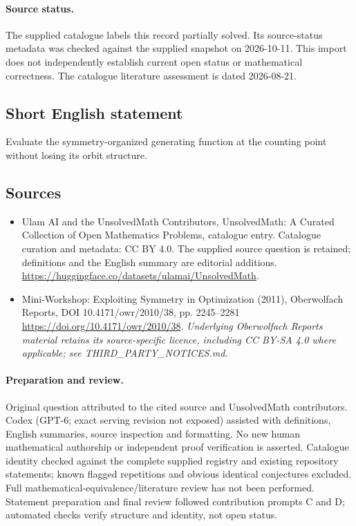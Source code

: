 \documentclass[11pt]{article}
\begin{document}
\paragraph{Source status.}
The supplied catalogue labels this record partially solved. Its source-status metadata was checked against the supplied snapshot on 2026-10-11. This import does not independently establish current open status or mathematical correctness. The catalogue literature assessment is dated 2026-08-21.
\subsection{Short English statement}
Evaluate the symmetry-organized generating function at the counting point without losing its orbit structure.
\subsection{Sources}
\begin{itemize}
\item[S1] Ulam AI and the UnsolvedMath Contributors, UnsolvedMath: A Curated Collection of Open Mathematics Problems, catalogue entry. Catalogue curation and metadata: CC BY 4.0. The supplied source question is retained; definitions and the English summary are editorial additions.
\url{https://huggingface.co/datasets/ulamai/UnsolvedMath}.
\item[S2] Mini-Workshop: Exploiting Symmetry in Optimization (2011), Oberwolfach Reports, DOI 10.4171/owr/2010/38, pp. 2245--2281
\url{https://doi.org/10.4171/owr/2010/38}.
\textit{Underlying Oberwolfach Reports material retains its source-specific licence, including CC BY-SA 4.0 where applicable; see THIRD\_PARTY\_NOTICES.md.}
\end{itemize}
\paragraph{Preparation and review.}
Original question attributed to the cited source and UnsolvedMath contributors. Codex (GPT-6; exact serving revision not exposed) assisted with definitions, English summaries, source inspection and formatting. No new human mathematical authorship or independent proof verification is asserted. Catalogue identity checked against the complete supplied registry and existing repository statements; known flagged repetitions and obvious identical conjectures excluded. Full mathematical-equivalence/literature review has not been performed. Statement preparation and final review followed contribution prompts C and D; automated checks verify structure and identity, not open status.
\label{end:statement}
\end{document}

